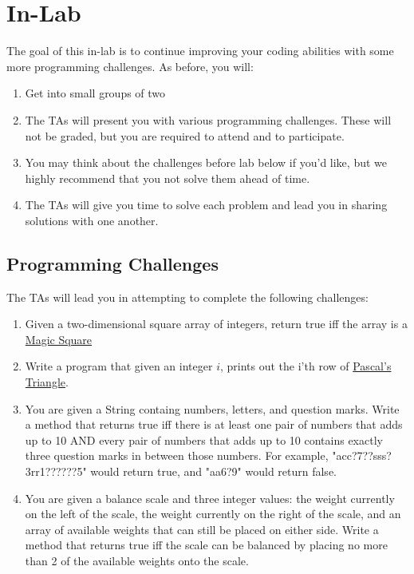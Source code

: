 \documentclass[paper=a4, fontsize=11pt, parskip=full]{scrartcl} %
\numberwithin{equation}{section} %
\numberwithin{figure}{section} %
\numberwithin{table}{section} %
\begin{document}
\section{In-Lab}

The goal of this in-lab is to continue improving your coding abilities with some more programming challenges. As before, you will:

\begin{enumerate}
	\item Get into small groups of two
	\item The TAs will present you with various programming challenges. These will not be graded, but you are required to attend and to participate.
	\item You may think about the challenges before lab below if you'd like, but we highly recommend that you not solve them ahead of time.
	\item The TAs will give you time to solve each problem and lead you in sharing solutions with one another.
\end{enumerate}

\subsection{Programming Challenges}

The TAs will lead you in attempting to complete the following challenges:

\begin{enumerate}
	\item Given a two-dimensional square array of integers, return true iff the array is a \href{https://en.wikipedia.org/wiki/Magic_square}{Magic Square}
	\item Write a program that given an integer $i$, prints out the i'th row of \href{https://en.wikipedia.org/wiki/Pascal%27s_triangle}{Pascal's Triangle}.
	\item You are given a String containg numbers, letters, and question marks. Write a method that returns true iff there is at least one pair of numbers that adds up to 10 AND every pair of numbers that adds up to 10 contains exactly three question marks in between those numbers. For example, "acc?7??sss?3rr1??????5" would return true, and "aa6?9" would return false.
	\item You are given a balance scale and three integer values: the weight currently on the left of the scale, the weight currently on the right of the scale, and an array of available weights that can still be placed on either side. Write a method that returns true iff the scale can be balanced by placing no more than 2 of the available weights onto the scale.
\end{enumerate}
\end{document}
